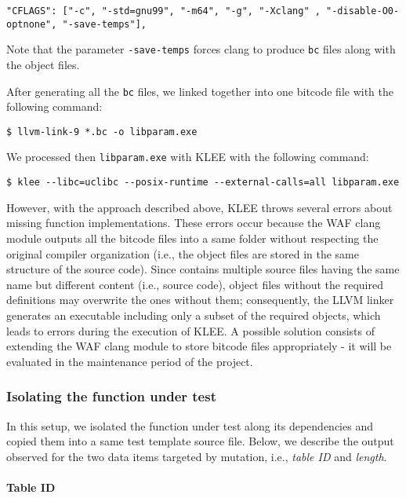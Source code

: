 \begin{lstlisting}[style=CStyle]
"CFLAGS": ["-c", "-std=gnu99", "-m64", "-g", "-Xclang" , "-disable-O0-optnone", "-save-temps"],
\end{lstlisting}

Note that the parameter \texttt{-save-temps} forces clang to produce \texttt{bc} files along with the object files.

After generating all the \texttt{bc} files, we linked together into one bitcode file with the following command:

\begin{lstlisting}[style=CStyle]
$ llvm-link-9 *.bc -o libparam.exe
\end{lstlisting}

We processed then \texttt{libparam.exe} with KLEE with the following command:

\begin{lstlisting}[style=CStyle]
$ klee --libc=uclibc --posix-runtime --external-calls=all libparam.exe
\end{lstlisting}

However, with the approach described above, KLEE throws several errors about missing function implementations. These errors occur because the WAF clang module outputs all the bitcode files into a same folder without respecting the original compiler organization (i.e., the object files are stored in the same structure of the source code). Since \PARAM contains multiple source files having the same name but different content (i.e., source code), object files without the required definitions may overwrite the ones without them; consequently, the LLVM linker generates an executable including only a subset of the required objects, which leads to errors during the execution of KLEE. A possible solution consists of extending the WAF clang module to store bitcode files appropriately - it will be evaluated in the maintenance period of the project.


\subsubsection{Isolating the function under test}

In this setup, we isolated the function under test along its dependencies and copied them into a same test template source file. Below, we describe the output observed for the two data items targeted by mutation, i.e.,
\emph{table ID} and \emph{length}.


\paragraph{Table ID}\

